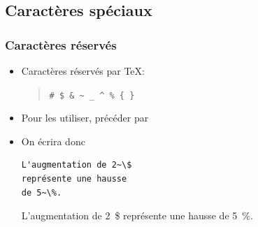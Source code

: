\subsection{Caractères spéciaux}

\begin{frame}[fragile=singleslide]
  \frametitle{Caractères réservés}

  \begin{itemize}
  \item Caractères réservés par {\TeX}:
    \begin{quote}
      \verb=# $ & ~ _ ^ % { }=
    \end{quote}
  \item Pour les utiliser, précéder par \bs
  \item On écrira donc
    \begin{demo}
      \begin{texample}
\begin{lstlisting}
L'augmentation de 2~\$
représente une hausse
de 5~\%.
\end{lstlisting}
        \producing
        L'augmentation de 2~\$ représente une
        hausse de 5~\%.
      \end{texample}
    \end{demo}
  \end{itemize}
\end{frame}

